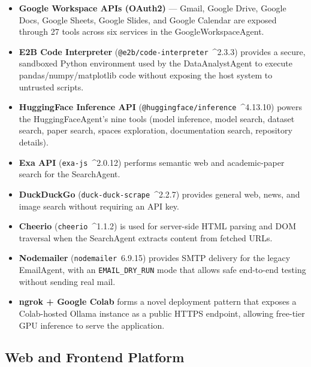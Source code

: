 \documentclass[11pt,a4paper]{report}
\newcommand{\code}[1]{\texttt{\small #1}}
\begin{document}
\begin{itemize}
  \item \textbf{Google Workspace APIs (OAuth2)} --- Gmail, Google Drive, Google Docs, Google Sheets, Google Slides, and Google Calendar are exposed through 27 tools across six services in the GoogleWorkspaceAgent.
  \item \textbf{E2B Code Interpreter} (\code{@e2b/code-interpreter}\ \^{}2.3.3) provides a secure, sandboxed Python environment used by the DataAnalystAgent to execute pandas/numpy/matplotlib code without exposing the host system to untrusted scripts.
  \item \textbf{HuggingFace Inference API} (\code{@huggingface/inference}\ \^{}4.13.10) powers the HuggingFaceAgent's nine tools (model inference, model search, dataset search, paper search, spaces exploration, documentation search, repository details).
  \item \textbf{Exa API} (\code{exa-js}\ \^{}2.0.12) performs semantic web and academic-paper search for the SearchAgent.
  \item \textbf{DuckDuckGo} (\code{duck-duck-scrape}\ \^{}2.2.7) provides general web, news, and image search without requiring an API key.
  \item \textbf{Cheerio} (\code{cheerio}\ \^{}1.1.2) is used for server-side HTML parsing and DOM traversal when the SearchAgent extracts content from fetched URLs.
  \item \textbf{Nodemailer} (\code{nodemailer}\ 6.9.15) provides SMTP delivery for the legacy EmailAgent, with an \code{EMAIL\_DRY\_RUN} mode that allows safe end-to-end testing without sending real mail.
  \item \textbf{ngrok + Google Colab} forms a novel deployment pattern that exposes a Colab-hosted Ollama instance as a public HTTPS endpoint, allowing free-tier GPU inference to serve the application.
\end{itemize}

\subsection{Web and Frontend Platform}
\end{document}
